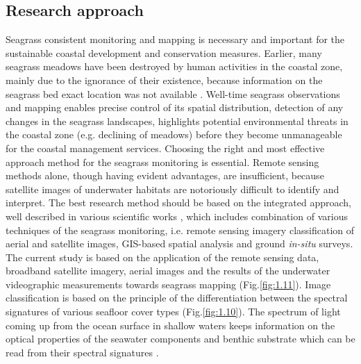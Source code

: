 \documentclass[11pt]{article}
\begin{document}
\subsection{Research approach}
Seagrass consistent monitoring and mapping is necessary and important for the sustainable coastal
development and conservation measures. Earlier, many seagrass meadows have been destroyed by
human activities in the coastal zone, mainly due to the ignorance of their existence, because
information on the seagrass bed exact location was not available \cite{Choo06}\label{Choo06}. Well-time seagrass
observations and mapping enables precise control of its spatial distribution, detection of any changes
in the seagrass landscapes, highlights potential environmental threats in the coastal zone (e.g.
declining of meadows) before they become unmanageable for the coastal management services.
Choosing the right and most effective approach method for the seagrass monitoring is essential.
Remote sensing methods alone, though having evident advantages, are insufficient, because satellite
images of underwater habitats are notoriously difficult to identify and interpret. The best research
method should be based on the integrated approach, well described in various scientific works \cite{Brown02,Montefalcone06,Kirkman96}\label{Brown02} \label{Montefalcone06} \label{Kirkman96}, which includes combination of various
techniques of the seagrass monitoring, i.e. remote sensing imagery classification of aerial and satellite
images, GIS-based spatial analysis and ground \textit{in-situ} surveys.
The current study is based on the application of the remote sensing data, broadband satellite imagery,
aerial images and the results of the underwater videographic measurements towards seagrass
mapping  (Fig.\ref{fig:1.11})\label{page-9}. Image classification is based on the principle of the differentiation between the spectral
signatures of various seafloor cover types  (Fig.\ref{fig:1.10})\label{page-9}. The spectrum of light coming up from the ocean surface in
shallow waters keeps information on the optical properties of the seawater components and benthic
substrate which can be read from their spectral signatures \cite{Werdell03}\label{Werdell03}. 
\end{document}
